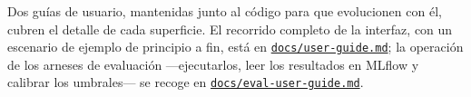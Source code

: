 Dos guías de usuario, mantenidas junto al código para que evolucionen con él, cubren el detalle de
cada superficie. El recorrido completo de la interfaz, con un escenario de ejemplo de principio a
fin, está en
\href{https://github.com/josepmafe/seshat/blob/main/docs/user-guide.md}{\texttt{docs/user-guide.md}};
la operación de los arneses de evaluación —ejecutarlos, leer los resultados en MLflow y calibrar los
umbrales— se recoge en
\href{https://github.com/josepmafe/seshat/blob/main/docs/eval-user-guide.md}{\texttt{docs/eval-user-guide.md}}.
